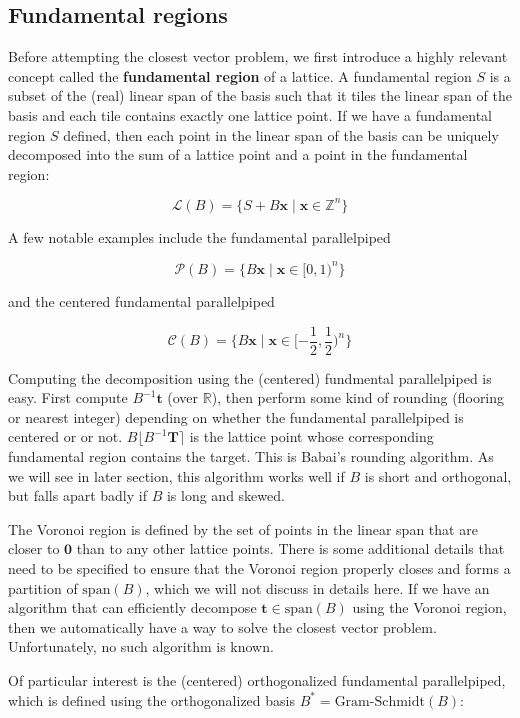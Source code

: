 \documentclass[letterpaper,12pt]{article}
\begin{document}
\subsection{Fundamental regions}
Before attempting the closest vector problem, we first introduce a highly relevant concept called the \textbf{fundamental region} of a lattice. A fundamental region $S$ is a subset of the (real) linear span of the basis such that it tiles the linear span of the basis and each tile contains exactly one lattice point. If we have a fundamental region $S$ defined, then each point in the linear span of the basis can be uniquely decomposed into the sum of a lattice point and a point in the fundamental region:

$$
\mathcal{L}(B) = \{S + B\mathbf{x} \mid \mathbf{x} \in \mathbb{Z}^n\}
$$

A few notable examples include the fundamental parallelpiped 

$$
\mathcal{P}(B) = \{B\mathbf{x} \mid \mathbf{x} \in [0, 1)^n\}
$$

and the centered fundamental parallelpiped

$$
\mathcal{C}(B) = \{B\mathbf{x} \mid \mathbf{x} \in [-\frac{1}{2}, \frac{1}{2})^n\}
$$

Computing the decomposition using the (centered) fundmental parallelpiped is easy. First compute $B^{-1}\mathbf{t}$ (over $\mathbb{R}$), then perform some kind of rounding (flooring or nearest integer) depending on whether the fundamental parallelpiped is centered or or not. $B\lfloor B^{-1}\mathbf{T} \rceil$ is the lattice point whose corresponding fundamental region contains the target. This is Babai's rounding algorithm. As we will see in later section, this algorithm works well if $B$ is short and orthogonal, but falls apart badly if $B$ is long and skewed.

The Voronoi region is defined by the set of points in the linear span that are closer to $\mathbf{0}$ than to any other lattice points. There is some additional details that need to be specified to ensure that the Voronoi region properly closes and forms a partition of $\text{span}(B)$, which we will not discuss in details here. If we have an algorithm that can efficiently decompose $\mathbf{t} \in \text{span}(B)$ using the Voronoi region, then we automatically have a way to solve the closest vector problem. Unfortunately, no such algorithm is known.

Of particular interest is the (centered) orthogonalized fundamental parallelpiped, which is defined using the orthogonalized basis $B^\ast = \text{Gram-Schmidt}(B)$:
\end{document}
